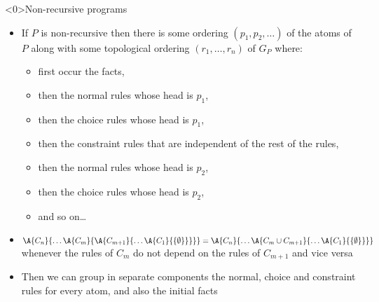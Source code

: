 
\begin{frame}<0>{Non-recursive programs}
  \begin{itemize}
    \item If $P$ is non-recursive then there is
          some ordering $(p_1, p_2, \ldots)$ of the atoms of $P$ along with
          some topological ordering
          $(r_1, \ldots, r_n)$ of $G_P$ where:
    \begin{itemize}
      \item first occur the facts, 
      \item then the normal rules whose head is $p_1$, 
      \item then the choice rules whose head is $p_1$, 
      \item then the constraint rules that are independent of the rest of the rules,
      \item then the normal rules whose head is $p_2$, 
      \item then the choice rules whose head is $p_2$, 
      \item and so on\ldots
    \end{itemize}
    \item $\A{C_n}{\ldots\A{C_m}{\A{C_{m+1}}{\ldots\A{C_1}{\{\emptyset\}}}}} =
           \A{C_n}{\ldots\A{C_m \cup C_{m+1}}{\ldots\A{C_1}{\{\emptyset\}}}}$ whenever 
            the rules of $C_m$ do not depend on the rules of $C_{m+1}$ and vice versa
    \item Then we can group in separate components
          the normal, choice and constraint rules for every atom, and also the initial facts
  \end{itemize}



\end{frame}


